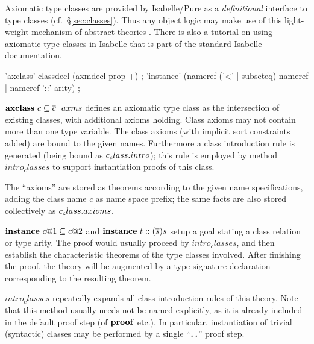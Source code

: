 Axiomatic type classes are provided by Isabelle/Pure as a \emph{definitional}
interface to type classes (cf.~\S\ref{sec:classes}).  Thus any object logic
may make use of this light-weight mechanism of abstract theories
\cite{Wenzel:1997:TPHOL}.  There is also a tutorial on using axiomatic type
classes in Isabelle \cite{isabelle-axclass} that is part of the standard
Isabelle documentation.

\begin{rail}
  'axclass' classdecl (axmdecl prop +)
  ;
  'instance' (nameref ('<' | subseteq) nameref | nameref '::' arity)
  ;
\end{rail}

\begin{descr}
  
\item [${\mathord{\mathbf{axclass}}}~c \subseteq \overline{c}~~axms$] defines an axiomatic type class as
  the intersection of existing classes, with additional axioms holding.  Class
  axioms may not contain more than one type variable.  The class axioms (with
  implicit sort constraints added) are bound to the given names.  Furthermore
  a class introduction rule is generated (being bound as
  $c_class{\mathord.}intro$); this rule is employed by method $intro_classes$ to
  support instantiation proofs of this class.
  
  The ``axioms'' are stored as theorems according to the given name
  specifications, adding the class name $c$ as name space prefix; the same
  facts are also stored collectively as $c_class{\mathord.}axioms$.
  
\item [${\mathord{\mathbf{instance}}}~c@1 \subseteq c@2$ and ${\mathord{\mathbf{instance}}}~t :: (\overline{s})s$] setup a
  goal stating a class relation or type arity.  The proof would usually
  proceed by $intro_classes$, and then establish the characteristic theorems
  of the type classes involved.  After finishing the proof, the theory will be
  augmented by a type signature declaration corresponding to the resulting
  theorem.

\item [$intro_classes$] repeatedly expands all class introduction rules of
  this theory.  Note that this method usually needs not be named explicitly,
  as it is already included in the default proof step (of ${\mathord{\mathbf{proof}}}$ etc.).
  In particular, instantiation of trivial (syntactic) classes may be performed
  by a single ``$\textbf{.\,.}$'' proof step.

\end{descr}



